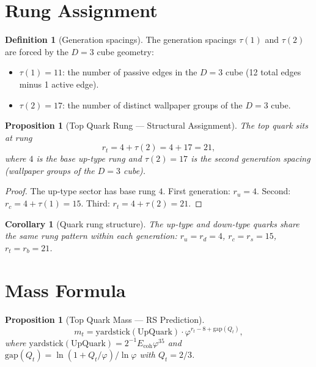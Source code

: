 \documentclass[12pt,a4paper]{article}
\newtheorem{corollary}[theorem]{Corollary}
\newtheorem{proposition}[theorem]{Proposition}
\theoremstyle{definition}
\newtheorem{definition}[theorem]{Definition}
\theoremstyle{remark}
\begin{document}
\section{Rung Assignment}
\label{sec:rung}

\begin{definition}[Generation spacings]
\label{def:tau}
The generation spacings $\tau(1)$ and $\tau(2)$ are forced by the
$D = 3$ cube geometry:
\begin{itemize}[nosep]
  \item $\tau(1) = 11$: the number of passive edges in the $D = 3$
  cube (12 total edges minus 1 active edge).
  \item $\tau(2) = 17$: the number of distinct wallpaper groups of
  the $D = 3$ cube.
\end{itemize}
\end{definition}

\begin{proposition}[Top Quark Rung --- Structural Assignment]
\label{thm:rung}
The top quark sits at rung
\begin{equation}
  r_t = 4 + \tau(2) = 4 + 17 = 21,
\end{equation}
where $4$ is the base up-type rung and $\tau(2) = 17$ is the second
generation spacing (wallpaper groups of the $D = 3$ cube).
\end{proposition}

\begin{proof}
The up-type sector has base rung $4$.  First generation: $r_u = 4$.
Second: $r_c = 4 + \tau(1) = 15$.  Third: $r_t = 4 + \tau(2) = 21$.
\end{proof}

\begin{corollary}[Quark rung structure]
The up-type and down-type quarks share the same rung pattern within
each generation: $r_u = r_d = 4$, $r_c = r_s = 15$, $r_t = r_b = 21$.
\end{corollary}

\section{Mass Formula}
\label{sec:mass}

\begin{proposition}[Top Quark Mass --- RS Prediction]
\label{thm:mass}
\begin{equation}
  m_t = \mathrm{yardstick}(\mathrm{UpQuark}) \cdot
  \varphi^{r_t - 8 + \mathrm{gap}(Q_t)},
\end{equation}
where $\mathrm{yardstick}(\mathrm{UpQuark}) = 2^{-1}
E_{\mathrm{coh}} \varphi^{35}$ and
$\mathrm{gap}(Q_t) = \ln(1 + Q_t/\varphi)/\ln\varphi$ with
$Q_t = 2/3$.
\end{proposition}
\end{document}
